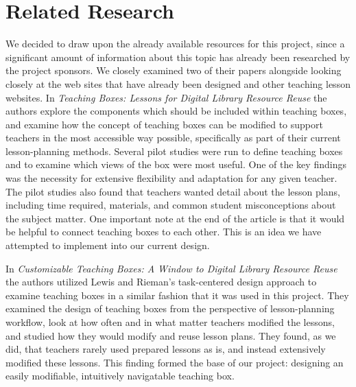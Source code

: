 \documentclass[10pt,letter]{article}
\begin{document}
\section{Related Research}
We decided to draw upon the already available resources for this project, since
a significant amount of information about this topic has already been researched
by the project sponsors.  We closely examined two of their papers alongside
looking closely at the web sites that have already been designed and other
teaching lesson websites.  In \textit{Teaching Boxes: Lessons for Digital
Library Resource Reuse}\cite{bib:khan-maull} the authors explore the components
which should be included within teaching boxes, and examine how the concept of
teaching boxes can be modified to support teachers in the most accessible way
possible, specifically as part of their current lesson-planning methods.
Several pilot studies were run to define teaching boxes and to examine which
views of the box were most useful.  One of the key findings was the necessity
for extensive flexibility and adaptation for any given teacher.  The pilot
studies also found that teachers wanted detail about the lesson plans, including
time required, materials, and common student misconceptions about the subject
matter.  One important note at the end of the article is that it would be
helpful to connect teaching boxes to each other.  This is an idea we have
attempted to implement into our current design.

In \textit{Customizable Teaching Boxes: A Window to Digital Library Resource
Reuse} \cite{bib:khan-maull2} the authors utilized Lewis and Rieman's
task-centered design approach to examine teaching boxes in a similar fashion
that it was used in this project.  They examined the design of teaching boxes
from the perspective of lesson-planning workflow, look at how often and in what
matter teachers modified the lessons, and studied how they would modify and
reuse lesson plans.  They found, as we did, that teachers rarely used prepared
lessons as is, and instead extensively modified these lessons.  This finding
formed the base of our project: designing an easily modifiable, intuitively
navigatable teaching box.
\end{document}
